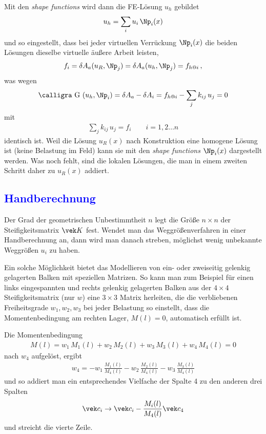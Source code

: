 {Mit den {\em shape functions\/} wird dann die FE-L\"{o}sung $u_h $ gebildet
\begin{align}
 u_h = \sum_i u_i\,\Np_i(x)
\end{align}
und so eingestellt, dass bei jeder virtuellen Verr\"{u}ckung $\Np_i(x)$ die beiden L\"{o}sungen dieselbe virtuelle \"{a}u{\ss}ere Arbeit leisten,
\begin{align}
f_i = \delta A_a(u_R,\Np_j) = \delta A_a(u_h,\Np_j) = f_{h @i}\,,
\end{align}
was wegen
\begin{align}
\text{\normalfont\calligra G\,\,}(u_h,\Np_i) = \delta A_a - \delta A_i = f_{h @i} - \sum_j k_{ij} \,u_j = 0
\end{align}
mit
\begin{align}
\sum_j k_{ij} \,u_j = f_i \qquad i = 1,2\ldots n
\end{align}
identisch ist. Weil die L\"{o}sung $u_R(x)$ nach Konstruktion eine homogene L\"{o}sung ist (keine Belastung im Feld) kann sie mit den {\em shape functions\/} $\Np_i(x)$ dargestellt werden. Was noch fehlt, sind die lokalen L\"{o}sungen, die man in einem zweiten Schritt daher zu $u_R(x)$ addiert.

{\textcolor{blue}{\subsection{Handberechnung}}
Der Grad der geometrischen Unbestimmtheit  $n$ legt die Gr\"{o}{\ss}e $n \times n$ der Steifigkeitsmatrix $\vek K$ fest. Wendet man das Weggr\"{o}{\ss}enverfahren in einer Handberechnung an, dann wird man danach streben, m\"{o}glichst wenig unbekannte Weggr\"{o}{\ss}en $u_i$ zu haben.

Ein solche M\"{o}glichkeit bietet das Modellieren von ein- oder zweiseitig gelenkig gelagerten Balken mit speziellen Matrizen. So kann man zum Beispiel f\"{u}r einen links eingespannten und rechts gelenkig gelagerten Balken aus der $4 \times 4$ Steifigkeitsmatrix (nur $w$) eine $3 \times 3$ Matrix herleiten, die die verbliebenen Freiheitsgrade $w_1, w_2, w_3$ bei jeder Belastung so einstellt, dass die Momentenbedingung am rechten Lager, $M(l) = 0$, automatisch erf\"{u}llt ist.

Die Momentenbedingung
\begin{align}
M(l) = w_1\,M_1(l) + w_2\,M_2(l) + w_3\,M_3(l) + w_4\,M_4(l) = 0
\end{align}
nach $w_4$ aufgel\"{o}st, ergibt
\begin{align}
 w_4 = -w_1\,\frac{M_1(l)}{M_4(l)}-w_2\,\frac{M_2(l)}{M_4(l)}-w_3\,\frac{M_3(l)}{M_4(l)}
\end{align}
und so addiert man ein entsprechendes Vielfache der Spalte 4 zu den anderen drei Spalten
\begin{align}
\vek c_i \to \vek c_i - \frac{M_i(l)}{M_4(l)} \vek c_4
\end{align}
und streicht die vierte Zeile.

}}
